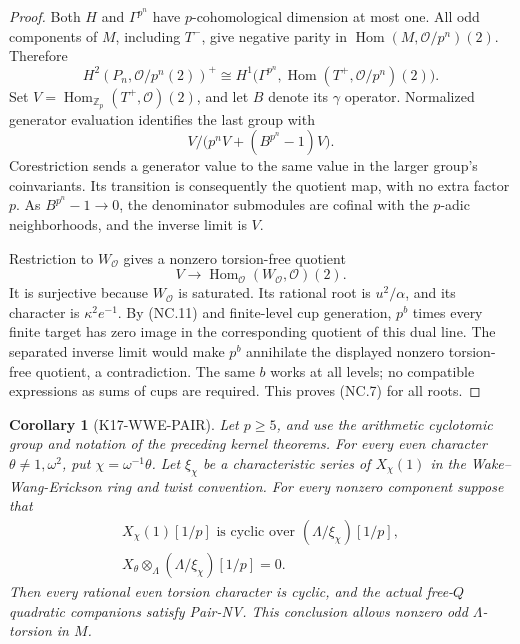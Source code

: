 \documentclass[11pt,a4paper]{article}
\newtheorem{corollary}[theorem]{Corollary}
\theoremstyle{definition}
\begin{document}
\begin{proof}
Both \(H\) and \(\Gamma^{p^n}\) have \(p\)-cohomological
dimension at most one.  All odd components of \(M\), including \(T^-\),
give negative parity in \(\operatorname{Hom}(M,\mathcal O/p^n)(2)\).
Therefore
\[
 H^2(P_n,\mathcal O/p^n(2))^+
 \cong H^1\bigl(\Gamma^{p^n},
         \operatorname{Hom}(T^+,\mathcal O/p^n)(2)\bigr).
                                                               \tag{NC.12}
\]
Set \(V=\operatorname{Hom}_{\mathbb Z_p}(T^+,\mathcal O)(2)\),
and let \(B\) denote its \(\gamma\) operator.  Normalized
generator evaluation identifies the last group with
\[
                   V/\bigl(p^nV+(B^{p^n}-1)V\bigr).         \tag{NC.13}
\]
Corestriction sends a generator value to the same value in
the larger group's coinvariants.  Its transition is consequently
the quotient map, with no extra factor \(p\).
As \(B^{p^n}-1\to0\), the denominator submodules are cofinal
with the \(p\)-adic neighborhoods, and the inverse limit is \(V\).

Restriction to \(W_{\mathcal O}\) gives a nonzero torsion-free
quotient
\[
 V\longrightarrow
       \operatorname{Hom}_{\mathcal O}(W_{\mathcal O},\mathcal O)(2).
\]
It is surjective because \(W_{\mathcal O}\) is saturated.
Its rational root is \(u^2/\alpha\), and its character is
\(\kappa^2 e^{-1}\).
By (NC.11) and finite-level cup generation, \(p^b\) times every
finite target has zero image in the corresponding quotient of
this dual line.  The separated inverse limit would make \(p^b\)
annihilate the displayed nonzero torsion-free quotient,
a contradiction.  The same \(b\) works at all levels; no
compatible expressions as sums of cups are required.
This proves (NC.7) for all roots.
\end{proof}

\begin{corollary}[K17-WWE-PAIR]\label{cor:wwe-pair}
Let \(p\geq5\), and use the arithmetic cyclotomic group and
notation of the preceding kernel theorems.
For every even character \(\theta\ne1,\omega^2\), put
\(\chi=\omega^{-1}\theta\).
Let \(\xi_\chi\) be a characteristic series of \(X_\chi(1)\)
in the Wake--Wang-Erickson ring and twist convention.
For every nonzero component suppose that
\[
 \begin{gathered}
 X_\chi(1)[1/p]\text{ is cyclic over }
                         (\Lambda/\xi_\chi)[1/p],\\
 X_\theta\otimes_\Lambda(\Lambda/\xi_\chi)[1/p]=0.
 \end{gathered}                                             \tag{NC.14}
\]
Then every rational even torsion character is cyclic, and the
actual free-\(Q\) quadratic companions satisfy Pair-NV.
This conclusion allows nonzero odd \(\Lambda\)-torsion in \(M\).
\end{corollary}
\end{document}
